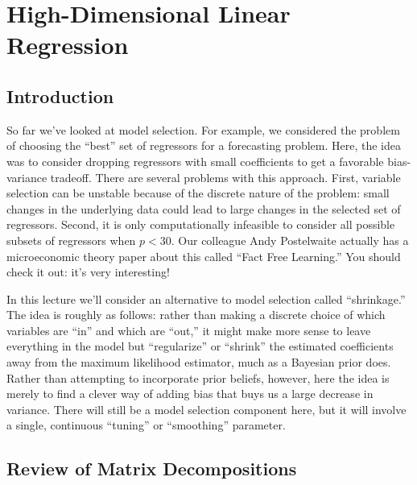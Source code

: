 \chapter{High-Dimensional Linear Regression}
\section{Introduction}
So far we've looked at model selection. 
For example, we considered the problem of choosing the ``best'' set of regressors for a forecasting problem. 
Here, the idea was to consider dropping regressors with small coefficients to get a favorable bias-variance tradeoff. 
There are several problems with this approach. 
First, variable selection can be unstable because of the discrete nature of the problem: small changes in the underlying data could lead to large changes in the selected set of regressors. 
Second, it is only computationally infeasible to consider all possible subsets of regressors when $p < 30$. 
Our colleague Andy Postelwaite actually has a microeconomic theory paper about this called ``Fact Free Learning.'' 
You should check it out: it's very interesting!

In this lecture we'll consider an alternative to model selection called ``shrinkage.'' 
The idea is roughly as follows: rather than making a discrete choice of which variables are ``in'' and which are ``out,'' it might make more sense to leave everything in the model but ``regularize'' or ``shrink'' the estimated coefficients away from the maximum likelihood estimator, much as a Bayesian prior does. 
Rather than attempting to incorporate prior beliefs, however, here the idea is merely to find a clever way of adding bias that buys us a large decrease in variance. 
There will still be a model selection component here, but it will involve a single, continuous ``tuning'' or ``smoothing'' parameter.

%
\section{Review of Matrix Decompositions}
